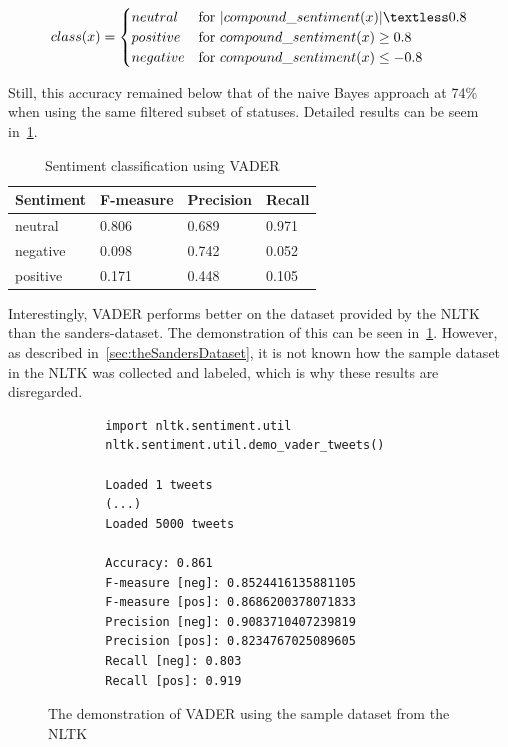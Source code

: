 \begin{equation}
    class(x) =
    \begin{cases}
        neutral & \text{for } |compound\_sentiment(x)| \textless 0.8 \\
        positive & \text{for } compound\_sentiment(x) \geq 0.8 \\
        negative & \text{for } compound\_sentiment(x) \leq -0.8 \\
    \end{cases}
\end{equation}

Still, this accuracy remained below that of the naive Bayes approach at 74\% when using the same filtered subset of statuses.
Detailed results can be seem in~\ref{tab:vader_results}.

\begin{table}
    \caption{Sentiment classification using VADER}
    \label{tab:vader_results}
    \centering
    \begin{tabular}{llll} %
        \toprule
        Sentiment
        & F-measure
        & Precision
        & Recall
        \\\midrule
        neutral & 0.806 & 0.689 & 0.971
        \\\midrule
        negative & 0.098 & 0.742 & 0.052
        \\\midrule
        positive & 0.171 & 0.448 & 0.105
        \\\bottomrule
    \end{tabular}
\end{table}

Interestingly, VADER performs better on the dataset provided by the NLTK than the sanders-dataset.
The demonstration of this can be seen in~\ref{code:vader_demo}.
However, as described in~\ref{sec:theSandersDataset}, it is not known how the sample dataset in the NLTK was collected and labeled,
which is why these results are disregarded.

\begin{figure}
    \caption{The demonstration of VADER using the sample dataset from the NLTK}
    \label{code:vader_demo}
    \begin{verbatim}
        import nltk.sentiment.util
        nltk.sentiment.util.demo_vader_tweets()

        Loaded 1 tweets
        (...)
        Loaded 5000 tweets

        Accuracy: 0.861
        F-measure [neg]: 0.8524416135881105
        F-measure [pos]: 0.8686200378071833
        Precision [neg]: 0.9083710407239819
        Precision [pos]: 0.8234767025089605
        Recall [neg]: 0.803
        Recall [pos]: 0.919
    \end{verbatim}
\end{figure}

